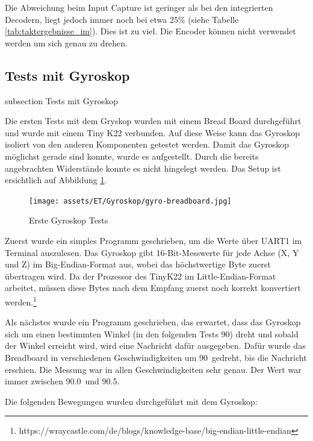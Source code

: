 Die Abweichung beim Input Capture ist geringer als bei den integrierten Decodern, liegt jedoch immer noch bei etwa 25\% (siehe Tabelle \ref{tab:taktergebnisse_im}). Dies ist zu viel. Die Encoder können nicht verwendet werden um sich genau zu drehen.



\newpage
\subsection*{Tests mit Gyroskop}\label{drehen-gyro}
    {subsection}
    {Tests mit Gyroskop}

Die ersten Tests mit dem Gryskop wurden mit einem Bread Board durchgeführt und wurde mit einem Tiny K22 verbunden. Auf diese Weise kann das Gyroskop isoliert von den anderen Komponenten getestet werden. Damit das Gyroskop möglichst gerade sind konnte, wurde es aufgestellt. Durch die bereits angebrachten Widerstände konnte es nicht hingelegt werden. Das Setup ist ersichtlich auf Abbildung \ref{img:gyro-tests-1}.

\begin{figure}[H]
\centering
\texttt{[image: assets/ET/Gyroskop/gyro-breadboard.jpg]}
\caption{Erste Gyroskop Tests}
\label{img:gyro-tests-1}
\end{figure}

Zuerst wurde ein simples Programm geschrieben, um die Werte über UART1 im Terminal auszulesen. Das Gyroskop gibt 16-Bit-Messwerte für jede Achse (X, Y und Z) im Big-Endian-Format aus, wobei das höchstwertige Byte zuerst übertragen wird. Da der Prozessor des TinyK22 im Little-Endian-Format arbeitet, müssen diese Bytes nach dem Empfang zuerst noch korrekt konvertiert werden.\footnote{https://wraycastle.com/de/blogs/knowledge-base/big-endian-little-endian}

Als nächstes wurde ein Programm geschrieben, das erwartet, dass das Gyroskop sich um einen bestimmten Winkel (in den folgenden Tests 90\textdegree) dreht und sobald der Winkel erreicht wird, wird eine Nachricht dafür ausgegeben. Dafür wurde das Breadboard in verschiedenen Geschwindigkeiten um 90\textdegree \ gedreht, bis die Nachricht erschien. Die Messung war in allen Geschwindigkeiten sehr genau. Der Wert war immer zwischen 90.0\textdegree \ und 90.5\textdegree.

Die folgenden Bewegungen wurden durchgeführt mit dem Gyroskop: 

